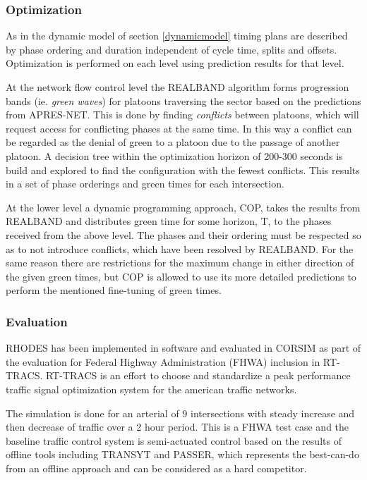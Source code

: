 \subsubsection*{Optimization}
As in the dynamic model of section \ref{dynamicmodel} timing plans are described by phase ordering and duration independent of cycle time, splits and offsets. 
Optimization is performed on each level using prediction results for that level.

At the network flow control level the REALBAND algorithm forms progression bands (ie. \textit{green waves}) for platoons traversing the sector based on the predictions from APRES-NET. This is done by finding \textit{conflicts} between platoons, which will request access for conflicting phases at the same time. In this way a conflict can be regarded as the denial of green to a platoon due to the passage of another platoon. A decision tree within the optimization horizon of 200-300 seconds is build and explored to find the configuration with the fewest conflicts. This results in a set of phase orderings and green times for each intersection.

At the lower level a dynamic programming approach, COP, takes the results from REALBAND and distributes green time for some horizon, T, to the phases received from the above level. The phases and their ordering must be respected so as to not introduce conflicts, which have been resolved by REALBAND. For the same reason there are restrictions for the maximum change in either direction of the given green times, but COP is allowed to use its more detailed predictions to perform the mentioned fine-tuning of green times.

\subsubsection*{Evaluation}
RHODES has been implemented in software and evaluated in CORSIM as part of the evaluation for Federal Highway Administration (FHWA) inclusion in RT-TRACS. RT-TRACS is an effort to choose and standardize a peak performance traffic signal optimization system for the american traffic networks.

The simulation is done for an arterial of 9 intersections with steady increase and then decrease of traffic over a 2 hour period. This is a FHWA test case and the baseline traffic control system is semi-actuated control based on the results of offline tools including TRANSYT and PASSER, which represents the best-can-do from an offline approach and can be considered as a hard competitor. 

